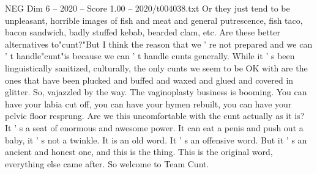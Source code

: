 \begin{textsample}{NEG Dim 6 – 2020 – Score 1.00 – 2020/t004038.txt}
Or they just tend to be unpleasant, horrible images of fish and meat and general putrescence, fish taco, bacon sandwich, badly stuffed kebab, bearded clam, etc.
Are these better alternatives to"cunt?"But I think the reason that we ' re not prepared and we can ' t handle"cunt"is because we can ' t handle cunts generally.
While it ' s been linguistically sanitized, culturally, the only cunts we seem to be OK with are the ones that have been plucked and buffed and waxed and glued and covered in glitter.
So, vajazzled by the way.
The vaginoplasty business is booming.
You can have your labia cut off, you can have your hymen rebuilt, you can have your pelvic floor resprung.
Are we this uncomfortable with the cunt actually as it is?
It ' s a seat of enormous and awesome power.
It can eat a penis and push out a baby, it ' s not a twinkle.
It is an old word.
It ' s an offensive word.
But it ' s an ancient and honest one, and this is the thing.
This is the original word, everything else came after.
So welcome to Team Cunt.

\end{textsample}
